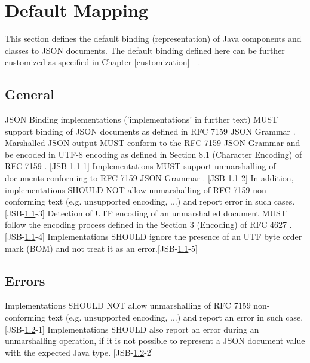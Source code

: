 \chapter{Default Mapping}
\label{defaultmapping}

This section defines the default binding (representation) of Java components and classes to JSON documents. The default binding defined here can be further customized as specified in Chapter \ref{customization} - .

\section{General}
\label{sec:general}
JSON Binding implementations ('implementations' in further text) MUST support binding of JSON documents as defined in RFC 7159 JSON Grammar \cite{rfc7159}. Marshalled JSON output MUST conform to the RFC 7159 JSON Grammar \cite{rfc7159} and be encoded in UTF-8 encoding as defined in Section 8.1 (Character Encoding) of RFC 7159 \cite{rfc7159}. [JSB-\ref{sec:general}-1] 
Implementations MUST support unmarshalling of documents conforming to RFC 7159 JSON Grammar \cite{rfc7159}. [JSB-\ref{sec:general}-2] In addition, implementations SHOULD NOT allow unmarshalling of RFC 7159 \cite{rfc7159} non-conforming text (e.g. unsupported encoding, ...) and report error in such cases. [JSB-\ref{sec:general}-3] 
Detection of UTF encoding of an unmarshalled document MUST follow the encoding process defined in the Section 3 (Encoding) of RFC 4627 \cite{rfc4627}. [JSB-\ref{sec:general}-4] 
Implementations SHOULD ignore the presence of an UTF byte order mark (BOM) and not treat it as an error.[JSB-\ref{sec:general}-5]

\section{Errors}
\label{sec:errors}
Implementations SHOULD NOT allow unmarshalling of RFC 7159 \cite{rfc7159} non-conforming text (e.g. unsupported encoding, ...) and report an error in such case. [JSB-\ref{sec:errors}-1] 
Implementations SHOULD also report an error during an unmarshalling operation, if it is not possible to represent a JSON document value with the expected Java type. [JSB-\ref{sec:errors}-2]

